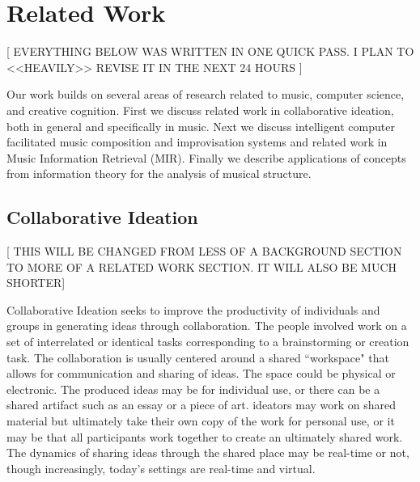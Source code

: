 \documentclass[final,authoryear,11pt,times]{elsarticle}
\begin{document}
\section{Related Work}

[ EVERYTHING BELOW WAS WRITTEN IN ONE QUICK PASS. I PLAN TO <<HEAVILY>> REVISE IT IN THE NEXT 24 HOURS ]

Our work builds on several areas of research related to music, computer science, and creative cognition. First we discuss related work in collaborative ideation, both in general and specifically in music. Next we discuss intelligent computer facilitated music composition and improvisation systems and related work in Music Information Retrieval (MIR). Finally we describe applications of concepts from information theory for the analysis of musical structure.


\subsection{Collaborative Ideation}

[ THIS WILL BE CHANGED FROM LESS OF A BACKGROUND SECTION TO MORE OF A RELATED WORK SECTION. IT WILL ALSO BE MUCH SHORTER] 

Collaborative Ideation seeks to improve the productivity of individuals and groups in generating ideas through collaboration. The people involved work on a set of interrelated or identical tasks corresponding to a brainstorming or creation task. The collaboration is usually centered around a shared ``workspace" that allows for communication and sharing of ideas. The space could be physical or electronic. The produced ideas may be for individual use, or there can be a shared artifact such as an essay or a piece of art. ideators may work on shared material but ultimately take their own copy of the work for personal use, or it may be that all participants work together to create an ultimately shared work. The dynamics of sharing ideas through the shared place may be real-time or not, though increasingly, today's settings are real-time and virtual.
\end{document}

